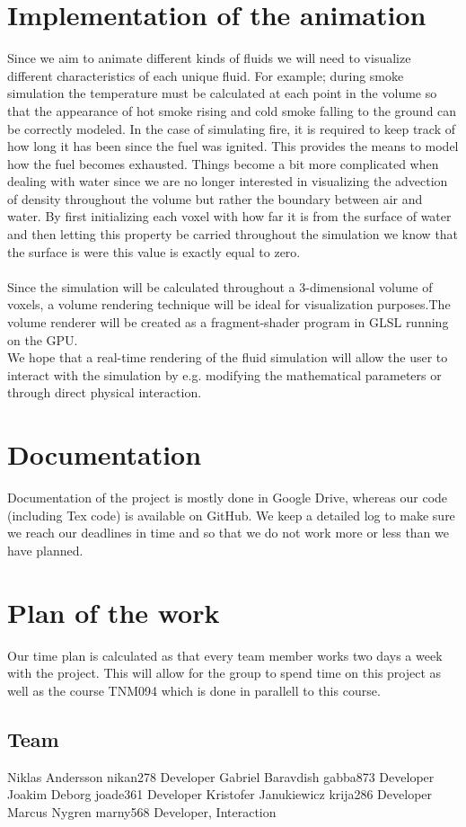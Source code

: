 \documentclass[a4paper,12pt,twoside,swedish]{report}
\begin{document}
\section{Implementation of the animation}
Since we aim to animate different kinds of fluids we will need to visualize different characteristics of each unique fluid.
For example; during smoke simulation the temperature must be calculated at each point in the volume so that the appearance of hot smoke rising and cold smoke falling to the ground can be correctly modeled. In the case of simulating fire, it is required to keep track of how long it has been since the fuel was ignited. This provides the means to model how the fuel becomes exhausted.
Things become a bit more complicated when dealing with water since we are no longer interested in visualizing the advection of density throughout the volume but rather the boundary between air and water. By first initializing each voxel with how far it is from the surface of water and then letting this property be carried throughout the simulation we know that the surface is were this value is exactly equal to zero.\\\\
Since the simulation will be calculated throughout a 3-dimensional volume of voxels, a volume rendering technique will be ideal for visualization purposes.The volume renderer will be created as a fragment-shader program   in GLSL running on the GPU.\\
We hope that a real-time rendering of the fluid simulation will allow the user to interact with the simulation by e.g. modifying the mathematical parameters or through direct physical interaction.\\

\section{Documentation}
Documentation of the project is mostly done in Google Drive, whereas our code (including Tex code) is available on GitHub.
We keep a detailed log to make sure we reach our deadlines in time and so that we do not work more or less than we have planned.

\section{Plan of the work}
Our time plan is calculated as that every team member works two days a week with the project. This will allow for the group to spend time on this project as well as the course TNM094 which is done in parallell to this course.

 \subsection{Team}
Niklas Andersson	nikan278	Developer
Gabriel Baravdish	gabba873	Developer
Joakim Deborg	joade361	Developer
Kristofer Janukiewicz	krija286	Developer
Marcus Nygren	marny568	Developer, Interaction
\end{document}
